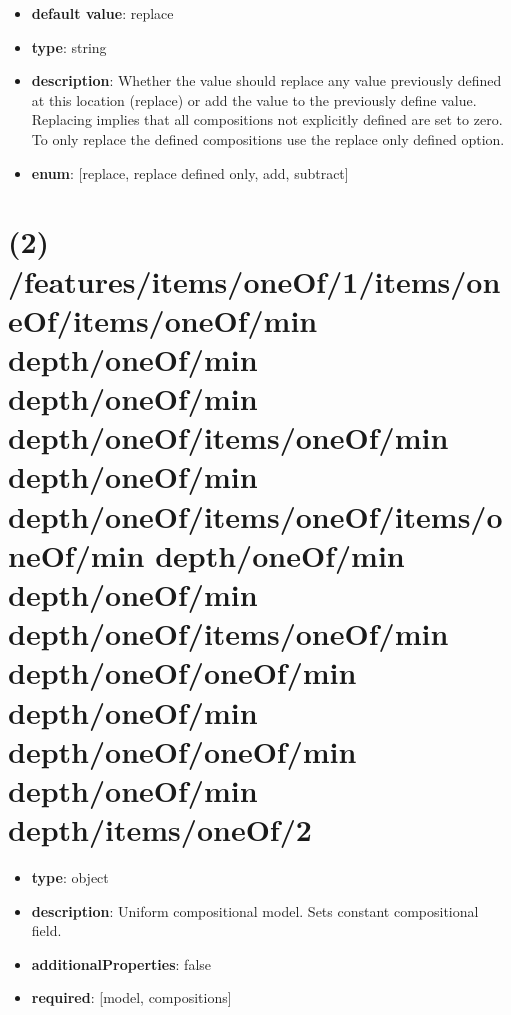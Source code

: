 \begin{itemize}[leftmargin=3em]\item {\bf default value}: replace
\item {\bf type}: string
\item {\bf description}: Whether the value should replace any value previously defined at this location (replace) or add the value to the previously define value. Replacing implies that all compositions not explicitly defined are set to zero. To only replace the defined compositions use the replace only defined option.
\item {\bf enum}: [replace, replace defined only, add, subtract]\end{itemize}\section{(2) /features/items/oneOf/1/items/oneOf/items/oneOf/min depth/oneOf/min depth/oneOf/min depth/oneOf/items/oneOf/min depth/oneOf/min depth/oneOf/items/oneOf/items/oneOf/min depth/oneOf/min depth/oneOf/min depth/oneOf/items/oneOf/min depth/oneOf/oneOf/min depth/oneOf/min depth/oneOf/oneOf/min depth/oneOf/min depth/items/oneOf/2}
\begin{itemize}[leftmargin=2em]\item {\bf type}: object
\item {\bf description}: Uniform compositional model. Sets constant compositional field.
\item {\bf additionalProperties}: false
\item {\bf required}: [model, compositions]\end{itemize}
